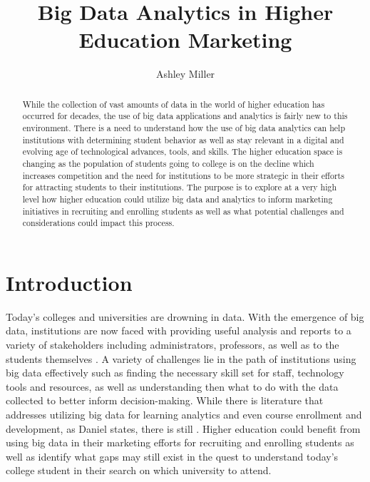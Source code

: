 \documentclass[sigconf]{acmart}
\begin{document}
\title{Big Data Analytics in Higher Education Marketing}


\author{Ashley Miller}



\renewcommand{\shortauthors}{B. Trovato et al.}


\begin{abstract}
While the collection of vast amounts of data in the world of higher education has occurred for decades, the use of big data applications and analytics is fairly new to this environment. There is a need to understand how the use of big data analytics can help institutions with determining student behavior as well as stay relevant in a digital and evolving age of technological advances, tools, and skills. The higher education space is changing as the population of students going to college is on the decline which increases competition and the need for institutions to be more strategic in their efforts for attracting students to their institutions. The purpose is to explore at a very high level how higher education could utilize big data and analytics to inform marketing initiatives in recruiting and enrolling students as well as what potential challenges and considerations could impact this process. 
\end{abstract}



\maketitle

\section{Introduction}

Today's colleges and universities are drowning in data. With the emergence of big data, institutions are now faced with providing useful analysis and reports to a variety of stakeholders including administrators, professors, as well as to the students themselves \cite{Daniel2015}. A variety of challenges lie in the path of institutions using big data effectively such as finding the necessary skill set for staff, technology tools and resources, as well as understanding then what to do with the data collected to better inform decision-making. 
While there is literature that addresses utilizing big data for learning analytics and even course enrollment and development, as Daniel states, there is still  \cite{Daniel2015}. Higher education could benefit from using big data in their marketing efforts for recruiting and enrolling students as well as identify what gaps may still exist in the quest to understand today’s college student in their search on which university to attend. 
\end{document}
